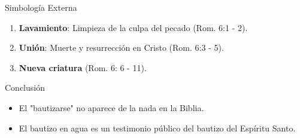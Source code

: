 \documentclass[17pt, aspectratio=169]{beamer}
\begin{document}
\begin{frame}{Simbolog\'ia Externa}
    \begin{enumerate}
        \item \textbf{Lavamiento}: Limpieza de la culpa del pecado (Rom. 6:1 - 2).
        \item \textbf{Uni\'on}: Muerte y resurrecci\'on en Cristo (Rom. 6:3 - 5).
        \item \textbf{Nueva criatura} (Rom. 6: 6 - 11).
    \end{enumerate}
\end{frame}

    
    

\begin{frame}{Conclusi\'on}
    \begin{itemize}
        \item El "bautizarse" no aparece de la nada en la Biblia.
        \item El bautizo en agua es un testimonio público del bautizo del Esp\'iritu Santo.
    \end{itemize}
\end{frame}
\end{document}
